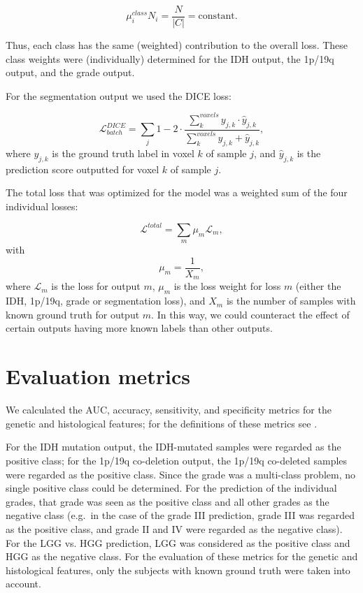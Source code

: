\begin{subappendices}
\begin{equation}
    \mu_i^{class} N_{i} = \frac{N}{\left|C\right|} = \text{constant}.
\end{equation}

Thus, each class has the same (weighted) contribution to the overall loss.
These class weights were (individually) determined for the \gls{IDH} output, the 1p/19q output, and the grade output.

For the segmentation output we used the DICE loss:

\begin{equation}
    \mathcal{L}^{DICE}_{batch} = \sum_j 1 - 2 \cdot \frac{\sum_k^{voxels} y_{j, k} \cdot \hat{y}_{j, k}}{\sum_k^{voxels} y_{j, k} + \hat{y}_{j, k}},
\end{equation}
where $y_{j, k}$ is the ground truth label in voxel $k$ of sample $j$, and $\hat{y}_{j,k}$ is the prediction score outputted for voxel $k$ of sample $j$.

The total loss that was optimized for the model was a weighted sum of the four individual losses:

\begin{equation}
    \mathcal{L}^{total} = \sum_m \mu_m \mathcal{L}_m,
\end{equation}
with
\begin{equation}
    \mu_m = \frac{1}{X_m},
\end{equation}
where $\mathcal{L}_m$ is the loss for output $m$, $\mu_m$ is the loss weight for loss $m$ (either the \gls{IDH}, 1p/19q, grade or segmentation loss), and $X_m$ is the number of samples with known ground truth for output $m$.
In this way, we could counteract the effect of certain outputs having more known labels than other outputs.



\clearpage


\newpage
\section{Evaluation metrics}\label{app:metric_defs}

We calculated the \gls{AUC}, accuracy, sensitivity, and specificity metrics for the genetic and histological features; for the definitions of these metrics see .

For the \gls{IDH} mutation output, the \gls{IDH}-mutated samples were regarded as the positive class; for the 1p/19q co-deletion output, the 1p/19q co-deleted samples were regarded as the positive class.
Since the grade was a multi-class problem, no single positive class could be determined.
For the prediction of the individual grades, that grade was seen as the positive class and all other grades as the negative class (e.g.\ in the case of the grade III prediction, grade III was regarded as the positive class, and grade II and IV were regarded as the negative class).
For the \gls{LGG} vs. \gls{HGG} prediction, \gls{LGG} was considered as the positive class and \gls{HGG} as the negative class.
For the evaluation of these metrics for the genetic and histological features, only the subjects with known ground truth were taken into account.


\end{subappendices}
